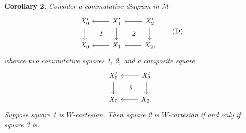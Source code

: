 \textbf{Corollary 2.} \textit{Consider a commutative diagram in $\mathcal{M}$}
\[
\begin{tikzcd}[ampersand replacement=\&]
X_0' \arrow[d] \& X_1' \arrow[l] \arrow[d] \arrow[dl, phantom, "\textit{1}"] \& X_2' \arrow[l] \arrow[d] \arrow[dl, phantom, "\textit{2}"] \\
X_0 \& X_1 \arrow[l] \& X_2, \arrow[l]
\end{tikzcd}
\tag*{(D)}
\]
\textit{whence two commutative squares 1, 2, and a composite square}
\[
\begin{tikzcd}[ampersand replacement=\&]
X_0' \arrow[d] \& X_2' \arrow[l] \arrow[d] \arrow[dl, phantom, "\textit{3}"] \\
X_0 \& X_2. \arrow[l]
\end{tikzcd}
\]
\textit{Suppose square 1 is $W$-cartesian. Then square 2 is $W$-cartesian if and only if square 3 is.}

